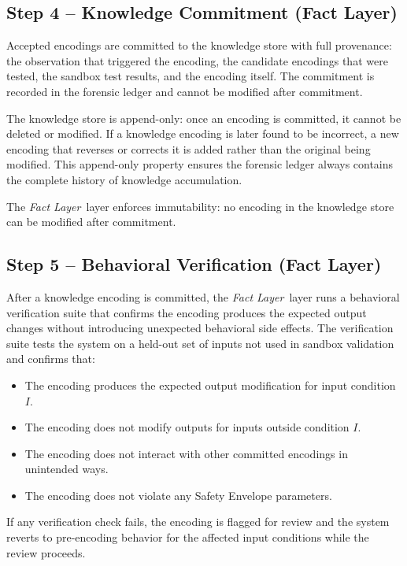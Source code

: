 \documentclass[12pt]{article}
\newcommand{\fact}{\textit{Fact Layer}}
\begin{document}
\subsection{Step 4 -- Knowledge Commitment (Fact Layer)}

Accepted encodings are committed to the knowledge store with full provenance: the observation that triggered the encoding, the candidate encodings that were tested, the sandbox test results, and the encoding itself. The commitment is recorded in the forensic ledger and cannot be modified after commitment.

The knowledge store is append-only: once an encoding is committed, it cannot be deleted or modified. If a knowledge encoding is later found to be incorrect, a new encoding that reverses or corrects it is added rather than the original being modified. This append-only property ensures the forensic ledger always contains the complete history of knowledge accumulation.

The \fact\ layer enforces immutability: no encoding in the knowledge store can be modified after commitment.

\subsection{Step 5 -- Behavioral Verification (Fact Layer)}

After a knowledge encoding is committed, the \fact\ layer runs a behavioral verification suite that confirms the encoding produces the expected output changes without introducing unexpected behavioral side effects. The verification suite tests the system on a held-out set of inputs not used in sandbox validation and confirms that:

\begin{itemize}[noitemsep]
    \item The encoding produces the expected output modification for input condition $I$.
    \item The encoding does not modify outputs for inputs outside condition $I$.
    \item The encoding does not interact with other committed encodings in unintended ways.
    \item The encoding does not violate any Safety Envelope parameters.
\end{itemize}

If any verification check fails, the encoding is flagged for review and the system reverts to pre-encoding behavior for the affected input conditions while the review proceeds.
\end{document}
